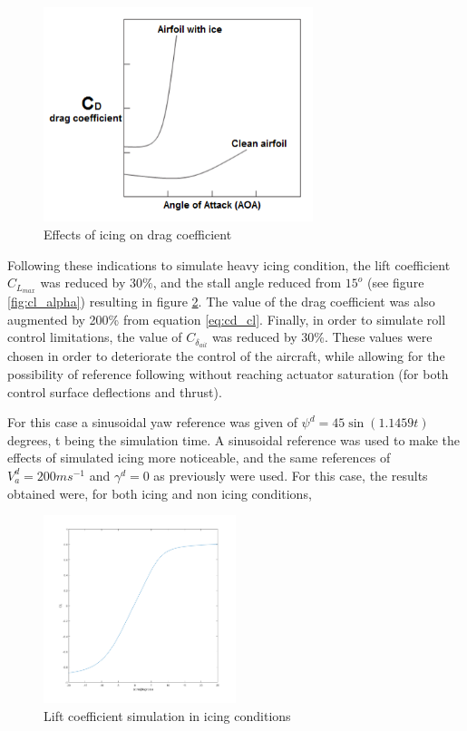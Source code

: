 \begin{figure}[H]
\centering
\includegraphics[width=0.7\textwidth]{Figures/Results/icing_drag.PNG}
\caption[Effects of icing on drag coefficient]{Effects of icing on drag coefficient \cite{icing_cond}}
\label{fig:icing_drag}
\end{figure}

Following these indications to simulate heavy icing condition, the lift coefficient $C_{L_{max}}$ was reduced by 30\%, and the stall angle reduced from $15^o$ (see figure \ref{fig:cl_alpha}) resulting in figure \ref{fig:cl_icing}. The value of the drag coefficient was also augmented by 200\% from equation \ref{eq:cd_cl}. Finally, in order to simulate roll control limitations, the value of $C_{\delta_{ail}}$ was reduced by 30\%. These values were chosen in order to deteriorate the control of the aircraft, while allowing for the possibility of reference following without reaching actuator saturation (for both control surface deflections and thrust). 

For this case a sinusoidal yaw reference was given of $\psi^d= 45 \sin (1.1459t)$ degrees, t being the simulation time. A sinusoidal reference was used to make the effects of simulated icing more noticeable, and the same references of $V_a^d=200ms^{-1}$ and $\gamma^d=0$ as previously were used. For this case, the results obtained were, for both icing and non icing conditions,

\begin{figure}[H]
\centering
\includegraphics[width=0.5\textwidth]{Figures/Results/cl_icing.PNG}
\caption[Lift coefficient simulation in icing conditions]{Lift coefficient simulation in icing conditions}
\label{fig:cl_icing}
\end{figure}


